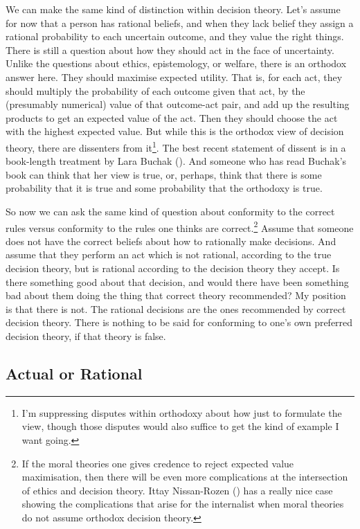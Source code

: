 \documentclass[
  10pt,
  letterpaper,
  twoside]{scrbook}
\begin{document}
We can make the same kind of distinction within decision theory. Let's
assume for now that a person has rational beliefs, and when they lack
belief they assign a rational probability to each uncertain outcome, and
they value the right things. There is still a question about how they
should act in the face of uncertainty. Unlike the questions about
ethics, epistemology, or welfare, there is an orthodox answer here. They
should maximise expected utility. That is, for each act, they should
multiply the probability of each outcome given that act, by the
(presumably numerical) value of that outcome-act pair, and add up the
resulting products to get an expected value of the act. Then they should
choose the act with the highest expected value. But while this is the
orthodox view of decision theory, there are dissenters from
it\footnote{I'm suppressing disputes within orthodoxy about how just to
  formulate the view, though those disputes would also suffice to get
  the kind of example I want going.}. The best recent statement of
dissent is in a book-length treatment by Lara Buchak
(). And someone who has read Buchak's
book can think that her view is true, or, perhaps, think that there is
some probability that it is true and some probability that the orthodoxy
is true.

So now we can ask the same kind of question about conformity to the
correct rules versus conformity to the rules one thinks are
correct.\footnote{If the moral theories one gives credence to reject
  expected value maximisation, then there will be even more
  complications at the intersection of ethics and decision theory. Ittay
  Nissan-Rozen () has a really nice
  case showing the complications that arise for the internalist when
  moral theories do not assume orthodox decision theory.} Assume that
someone does not have the correct beliefs about how to rationally make
decisions. And assume that they perform an act which is not rational,
according to the true decision theory, but is rational according to the
decision theory they accept. Is there something good about that
decision, and would there have been something bad about them doing the
thing that correct theory recommended? My position is that there is not.
The rational decisions are the ones recommended by correct decision
theory. There is nothing to be said for conforming to one's own
preferred decision theory, if that theory is false.

\subsection{Actual or Rational}\label{actualorrational}
\end{document}
